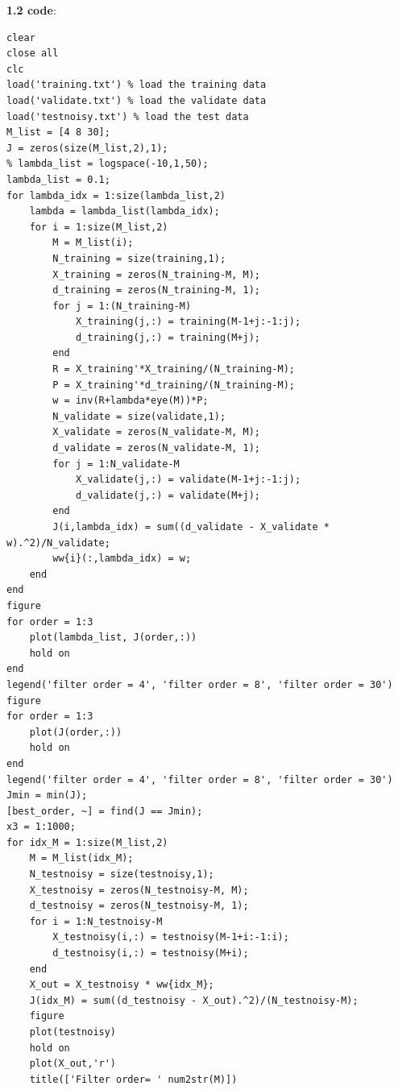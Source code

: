 \documentclass[a4paper]{article}
\begin{document}
\begin{spacing}{2.0}
\newpage
\textbf{1.2 code}:
\begin{lstlisting}
clear
close all
clc
load('training.txt') % load the training data
load('validate.txt') % load the validate data
load('testnoisy.txt') % load the test data
M_list = [4 8 30];
J = zeros(size(M_list,2),1);
% lambda_list = logspace(-10,1,50);
lambda_list = 0.1;
for lambda_idx = 1:size(lambda_list,2)
    lambda = lambda_list(lambda_idx);
    for i = 1:size(M_list,2)
        M = M_list(i);
        N_training = size(training,1);
        X_training = zeros(N_training-M, M);
        d_training = zeros(N_training-M, 1);
        for j = 1:(N_training-M)
            X_training(j,:) = training(M-1+j:-1:j);
            d_training(j,:) = training(M+j);
        end
        R = X_training'*X_training/(N_training-M);
        P = X_training'*d_training/(N_training-M);
        w = inv(R+lambda*eye(M))*P;
        N_validate = size(validate,1);
        X_validate = zeros(N_validate-M, M);
        d_validate = zeros(N_validate-M, 1);
        for j = 1:N_validate-M
            X_validate(j,:) = validate(M-1+j:-1:j);
            d_validate(j,:) = validate(M+j);
        end
        J(i,lambda_idx) = sum((d_validate - X_validate * w).^2)/N_validate;
        ww{i}(:,lambda_idx) = w;
    end
end
figure
for order = 1:3
    plot(lambda_list, J(order,:))
    hold on
end
legend('filter order = 4', 'filter order = 8', 'filter order = 30')
figure
for order = 1:3
    plot(J(order,:))
    hold on
end
legend('filter order = 4', 'filter order = 8', 'filter order = 30')
Jmin = min(J);
[best_order, ~] = find(J == Jmin);
x3 = 1:1000;
for idx_M = 1:size(M_list,2)
    M = M_list(idx_M);
    N_testnoisy = size(testnoisy,1);
    X_testnoisy = zeros(N_testnoisy-M, M);
    d_testnoisy = zeros(N_testnoisy-M, 1);
    for i = 1:N_testnoisy-M
        X_testnoisy(i,:) = testnoisy(M-1+i:-1:i);
        d_testnoisy(i,:) = testnoisy(M+i);
    end
    X_out = X_testnoisy * ww{idx_M};
	J(idx_M) = sum((d_testnoisy - X_out).^2)/(N_testnoisy-M);
    figure
    plot(testnoisy)
    hold on
    plot(X_out,'r')
    title(['Filter order= ' num2str(M)])
\end{lstlisting}	


\end{spacing}
\end{document}
